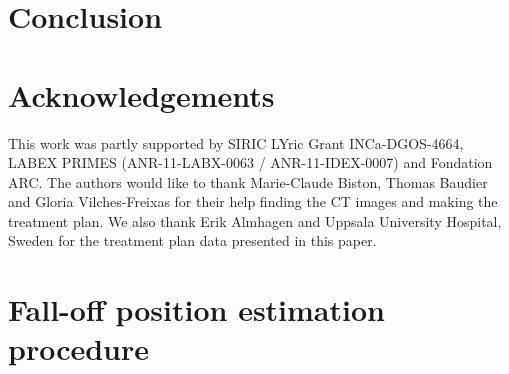\documentclass[a4paper,english]{article}
\begin{document}
\section{Conclusion}


\section{Acknowledgements}

This work was partly supported by SIRIC LYric Grant INCa-DGOS-4664, LABEX PRIMES (ANR-11-LABX-0063 / ANR-11-IDEX-0007) and Fondation ARC. The authors would like to thank Marie-Claude Biston, Thomas Baudier and Gloria Vilches-Freixas for their help finding the CT images and making the treatment plan. We also thank Erik Almhagen and Uppsala University Hospital, Sweden for the treatment plan data presented in this paper.

\newpage

\appendix
% 

\section{Fall-off position estimation procedure}\label{sec:fopproc}
\end{document}
